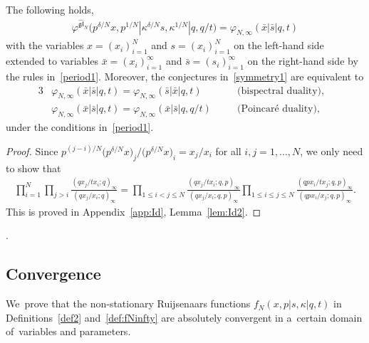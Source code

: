 \documentclass[pdftex]{sigma}%
\numberwithin{equation}{section}
\newcommand{\bx}{\bar{x}}
\newcommand{\bs}{\bar{s}}
\begin{document}
\begin{Fact}
\label{fact:Id}
The following holds,
\begin{gather*}
\varphi^{\widehat{\mathfrak{gl}}_N}\big(p^{\delta/N}x,p^{1/N}|\kappa^{\delta/N} s,\kappa^{1/N}|q,q/t\big) = \varphi_{N,\infty}(\bx|\bs|q,t)
\end{gather*}
with the variables $x=(x_i)_{i=1}^N$ and $s=(x_i)_{i=1}^N$ on the left-hand side extended to variables $\bx=(x_i)_{i=1}^\infty$ and $\bs=(s_i)_{i=1}^\infty$ on the right-hand side by the rules in~\eqref{period1}.
Moreover, the conjectures in~\eqref{symmetry1} are equivalent to
\begin{alignat}{3}
& \varphi_{N,\infty}(\bx|\bs|q,t)= \varphi_{N,\infty}(\bs|\bx|q,t) \quad && \text{(bispectral duality)},&\nonumber\\
& \varphi_{N,\infty}(\bx|\bs|q,t)= \varphi_{N,\infty}(\bx|\bs|q,q/t) \quad && \text{(Poincar\'e duality)},& \label{symmetry2}
\end{alignat}
under the conditions in~\eqref{period1}.
\end{Fact}

\begin{proof}Since $p^{(j-i)/N}\big(p^{\delta/N}x\big)_j/\big(p^{\delta/N}x\big)_i=x_j/x_i$ for all $i,j=1,\dots,N$, we only need to show that
\begin{gather*}
\prod_{i=1}^N \prod_{j>i} \frac{(qx_j/tx_i;q)_\infty}{(qx_j/x_i;q)_\infty} =
\prod_{1\leq i<j\leq N}\frac{(qx_j/tx_i;q,p)_\infty}{(qx_j/x_i;q,p)_\infty}
\prod_{1\leq i\leq j\leq N}\frac{(qpx_i/tx_j;q,p)_\infty}{(qpx_i/x_j;q,p)_\infty}.
\end{gather*}
This is proved in Appendix~\ref{app:Id}, Lemma~\ref{lem:Id2}.
\end{proof}.

\subsection{Convergence}\label{sec:convergence}

We~prove that the non-stationary Ruijsenaars functions $f_N\!(x,p|s,\kappa|q,t)$ in Definitions~\ref{def2} and~\ref{def:fNinfty} are absolutely convergent in a~certain domain of~variables and parameters.
\end{document}
